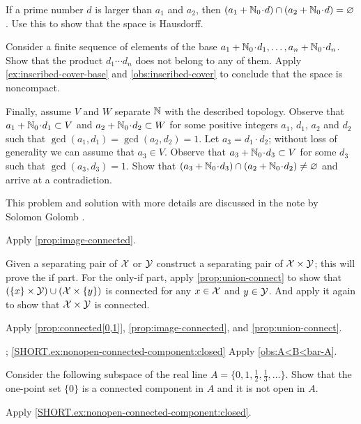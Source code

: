 If a prime number $d$ is larger than $a_1$ and $a_2$, then $(a_1+\NN_0\cdot d)\cap (a_2+\NN_0\cdot d)=\emptyset$.
Use this to show that the space is Hausdorff.

Consider a finite sequence of elements of the base $a_1+\NN_0\cdot d_1,\ldots, a_n+\NN_0\cdot d_n$.
Show that the product $d_1\cdots d_n$ does not belong to any of them.
Apply \ref{ex:inscribed-cover-base} and \ref{obs:inscribed-cover} to conclude that the space is noncompact.

Finally, assume $V$ and $W$ separate $\mathbb{N}$ with the described topology.
Observe that $a_1+\NN_0\cdot d_1\subset V$ and $a_2\z+\NN_0\cdot d_2\subset W$ for some positive integers $a_1$, $d_1$, $a_2$ and $d_2$ such that $\gcd(a_1,d_1)=\gcd(a_2,d_2)=1$.
Let $a_3=d_1\cdot d_2$;
without loss of generality we can assume that $a_3\in  V$.
Observe that $a_3+\NN_0\cdot  d_3\subset V$ for some $d_3$ such that $\gcd(a_3,d_3)=1$.
Show that $(a_3+\NN_0\cdot d_3)\cap (a_2+\NN_0\cdot d_2)\ne \emptyset$ and arrive at a contradiction.

This problem and solution with more details are discussed in the note by Solomon Golomb \cite{golomb}.

Apply \ref{prop:image-connected}.

Given a separating pair of $\mathcal{X}$ or $\mathcal{Y}$ construct a separating pair of $\mathcal{X}\times\mathcal{Y}$; this will prove the if part.
For the only-if part, apply \ref{prop:union-connect} to show that $(\{x\}\times \mathcal{Y})\cup(\mathcal{X}\times \{y\})$ is connected for any $x\in\mathcal{X}$ and $y\in \mathcal{Y}$.
And apply it again to show that
$\mathcal{X}\times \mathcal{Y}$ is connected.

Apply \ref{prop:connected[0,1]}, \ref{prop:image-connected}, and \ref{prop:union-connect}.

\parbf{\ref{ex:nonopen-connected-component}};
\ref{SHORT.ex:nonopen-connected-component:closed}
Apply \ref{obs:A<B<bar-A}.

Consider the following subspace of the real line $A=\{0,1,\tfrac12,\tfrac13,\ldots\}$.
Show that the one-point set $\{0\}$ is a connected component in $A$ and it is not open in $A$.

Apply  \ref{SHORT.ex:nonopen-connected-component:closed}.

